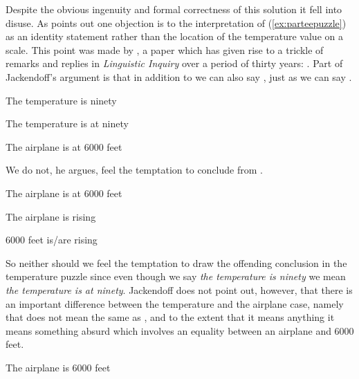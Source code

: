 Despite the obvious ingenuity and formal correctness of this solution
it fell into disuse.  As \cite{Loebner2015} points out one objection
is to the interpretation of (\ref{ex:parteepuzzle}) as an identity
statement rather than the location of the temperature value on a
scale.  This point was made by \cite{Jackendoff1979}, a paper which
has given rise to a trickle of remarks and replies in
\textit{Linguistic Inquiry} over a period of thirty years:
\cite{Lobner1981,Lasersohn2005a,Romero2008}.  Part of Jackendoff's
argument is that in addition to  we can also say ,
just as we can say .  
\begin{ex} 
\begin{subex} 
 
\item The temperature is ninety 
 
\item The temperature is at ninety

\item The airplane is at 6000 feet 
 
\end{subex} 
   
\end{ex} 
We do not, he argues, feel the temptation to conclude  from
.
\begin{ex} 
\begin{subex} 
 
\item The airplane is at 6000 feet 
 
\item The airplane is rising

\item 6000 feet is/are rising 
 
\end{subex} 
   
\end{ex} 
So neither should we feel the temptation to draw the offending
conclusion in the temperature puzzle since even though we say
\textit{the temperature is ninety} we mean \textit{the temperature is
  at ninety}.  Jackendoff does not point out, however, that there is
an important difference between the temperature and the airplane case,
namely that \nexteg{} does not mean the same as , and to the
extent that it means anything it means something absurd which involves an
equality between an airplane and 6000 feet.
\begin{ex} 
The airplane is 6000 feet 
\end{ex} 
